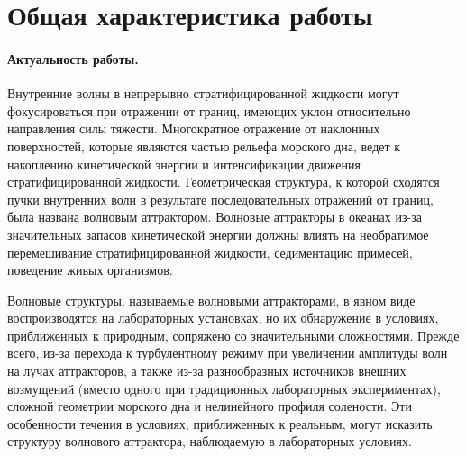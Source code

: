 \documentclass[utf8x]{G7-32} %
\begin{document}
\setcounter{page}{3}
\pagestyle{fancy}
\setcounter{secnumdepth}{-1}

\section{Общая характеристика работы}


\paragraph{Актуальность работы.}

Внутренние волны в непрерывно стратифицированной жидкости могут фокусироваться при отражении от границ, имеющих уклон относительно направления силы тяжести.
Многократное отражение от наклонных поверхностей, которые являются частью рельефа морского дна, ведет к накоплению кинетической энергии и интенсификации движения стратифицированной жидкости. 
Геометрическая структура, к которой сходятся пучки внутренних волн в результате последовательных отражений от границ, была названа волновым аттрактором.
Волновые аттракторы в океанах из-за значительных запасов кинетической энергии должны влиять на необратимое перемешивание стратифицированной жидкости, седиментацию примесей, поведение живых организмов. 

Волновые структуры, называемые волновыми аттракторами, в явном виде воспроизводятся на лабораторных установках, но их обнаружение в условиях, приближенных к природным, сопряжено со значительными сложностями. Прежде всего, из-за перехода к турбулентному режиму при увеличении амплитуды волн на лучах аттракторов, а также из-за разнообразных источников внешних возмущений (вместо одного при традиционных лабораторных экспериментах), сложной геометрии морского дна и нелинейного профиля солености. Эти особенности течения в условиях, приближенных к реальным, могут исказить структуру волнового аттрактора, наблюдаемую в лабораторных условиях. 
\end{document}
